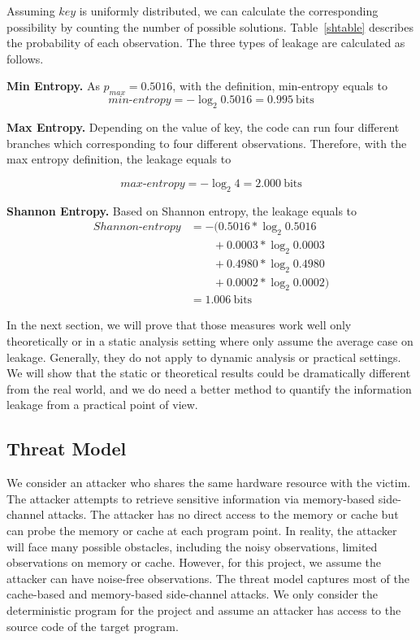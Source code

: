 Assuming $key$ is uniformly distributed, we can calculate the corresponding
possibility by counting the number of possible solutions. Table~\ref{shtable}
describes the probability of each observation. The three types of leakage are
calculated as follows.

\vspace{3pt}
\textbf{Min Entropy.}
As $p_{\mathit{max}} = 0.5016$, with the definition, min-entropy equals to
\begin{displaymath}
    \mathit{min\text{-}entropy} = -\log_2{0.5016} = 0.995\ \mathrm{bits}
\end{displaymath}

\textbf{Max Entropy.}
Depending on the value of key, the code can run four different branches which
corresponding to four different observations. Therefore, with the max entropy
definition, the leakage equals to

\begin{displaymath}
    \mathit{max\text{-}entropy} = -\log_2{4} = 2.000\ \mathrm{bits}
\end{displaymath}

\vspace{3pt}
\textbf{Shannon Entropy.}
Based on Shannon entropy, the leakage equals to
\begin{align*}
    \mathit{Shannon\text{-}entropy} & = -(0.5016*\log_{2}0.5016      \\
                                    & \qquad+ 0.0003*\log_{2}0.0003  \\
                                    & \qquad+ 0.4980*\log_{2}0.4980  \\
                                    & \qquad+ 0.0002*\log_{2}0.0002) \\
                                    & = 1.006\ \mathrm{bits}
\end{align*}

In the next section, we will prove that those measures work well only
theoretically or in a static analysis setting where only assume the average case
on leakage. Generally, they do not apply to dynamic analysis or practical
settings. We will show that the static or theoretical results could be
dramatically different from the real world, and we do need a better method to
quantify the information leakage from a practical point of view.

\subsection{Threat Model}
We consider an attacker who shares the same hardware resource with the victim.
The attacker attempts to retrieve sensitive information via memory-based
side-channel attacks. The attacker has no direct access to the memory or cache
but can probe the memory or cache at each program point. In reality, the
attacker will face many possible obstacles, including the noisy observations,
limited observations on memory or cache. However, for this project, we assume
the attacker can have noise-free observations. The threat model captures most of
the cache-based and memory-based side-channel attacks. We only consider the
deterministic program for the project and assume an attacker has access to the
source code of the target program.